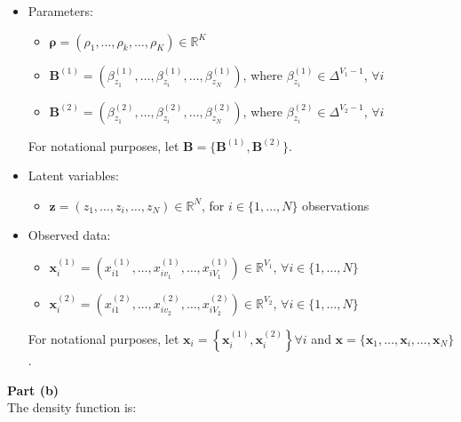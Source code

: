 \documentclass[a4paper, 11pt]{article}
\begin{document}
\begin{itemize}
\item Parameters:
\begin{itemize}
\item $\pmb{\rho} = ( \rho_1, \dots, \rho_k, \dots, \rho_K ) \in \mathbb{R}^K$
\item $\mathbf{B}^{(1)} = \left( \beta_{z_1}^{(1)}, \dots, \beta_{z_i}^{(1)}, \dots, \beta_{z_N}^{(1)} \right)$, where $\beta_{z_i}^{(1)} \in \Delta^{V_1 - 1}$, $\forall i$
\item $\mathbf{B}^{(2)} = \left( \beta_{z_1}^{(2)}, \dots, \beta_{z_i}^{(2)}, \dots, \beta_{z_N}^{(2)} \right)$, where $\beta_{z_i}^{(2)} \in \Delta^{V_2 - 1}$, $\forall i$
\end{itemize}
For notational purposes, let $\mathbf{B} = \{ \mathbf{B}^{(1)}, \mathbf{B}^{(2)} \}$.
\item Latent variables:
\begin{itemize}
\item $\mathbf{z} = (z_1, \dots, z_i, \dots, z_N) \in \mathbb{R}^{N}$, for $i \in \{ 1, \dots, N \}$ observations
\end{itemize}
\item Observed data:
\begin{itemize}
\item $\mathbf{x}_i^{(1)} = \left( x_{i1}^{(1)}, \dots, x_{iv_1}^{(1)}, \dots, x_{iV_1}^{(1)} \right) \in \mathbb{R}^{V_1}$, $\forall i \in \{ 1, \dots, N \}$
\item $\mathbf{x}_i^{(2)} = \left( x_{i1}^{(2)}, \dots, x_{iv_2}^{(2)}, \dots, x_{iV_2}^{(2)} \right) \in \mathbb{R}^{V_2}$, $\forall i \in \{ 1, \dots, N \}$
\end{itemize}
For notational purposes, let $\mathbf{x}_i = \left\{ \mathbf{x}_i^{(1)}, \mathbf{x}_i^{(2)} \right\} \forall i$ and $\mathbf{x} = \{ \mathbf{x}_1, \dots, \mathbf{x}_i, \dots, \mathbf{x}_N \}$.
\end{itemize}
\textbf{Part (b)}\\
\newline The density function is:
\end{document}

